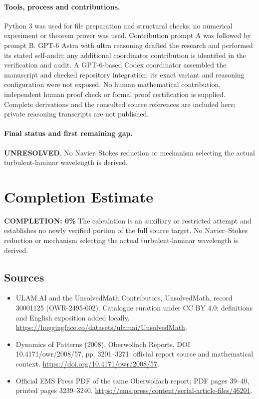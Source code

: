 \documentclass[11pt]{article}
\begin{document}
\paragraph{Tools, process and contributions.}
Python 3 was used for file preparation and structural checks; no numerical experiment or theorem prover was used. Contribution prompt A was followed by prompt B. GPT-6 Astra with ultra reasoning drafted the research and performed its stated self-audit; any additional coordinator contribution is identified in the verification and audit. A GPT-6-based Codex coordinator assembled the manuscript and checked repository integration; its exact variant and reasoning configuration were not exposed. No human mathematical contribution, independent human proof check or formal proof certification is supplied. Complete derivations and the consulted source references are included here; private reasoning transcripts are not published.

\paragraph{Final status and first remaining gap.}
\textbf{UNRESOLVED}. No Navier–Stokes reduction or mechanism selecting the actual turbulent-laminar wavelength is derived.

\section{Completion Estimate}
\noindent\textbf{COMPLETION: 0\%}
The calculation is an auxiliary or restricted attempt and establishes no newly verified portion of the full source target. No Navier–Stokes reduction or mechanism selecting the actual turbulent-laminar wavelength is derived.

\subsection{Sources}
\begin{itemize}
\item[\hypertarget{source:30001125:1}{S1}] ULAM.AI and the UnsolvedMath Contributors, UnsolvedMath, record 30001125 (OWR-2495-002). Catalogue curation under CC BY 4.0; definitions and English exposition added locally.
\url{https://huggingface.co/datasets/ulamai/UnsolvedMath}.
\item[\hypertarget{source:30001125:2}{S2}] Dynamics of Patterns (2008), Oberwolfach Reports, DOI 10.4171/owr/2008/57, pp. 3201--3271; official report source and mathematical context.
\url{https://doi.org/10.4171/owr/2008/57}.
\item[\hypertarget{source:30001125:3}{S3}] Official EMS Press PDF of the same Oberwolfach report; PDF pages 39--40, printed pages 3239--3240.
\url{https://ems.press/content/serial-article-files/46201}.
\end{itemize}
\label{end:30001125}
\end{document}

